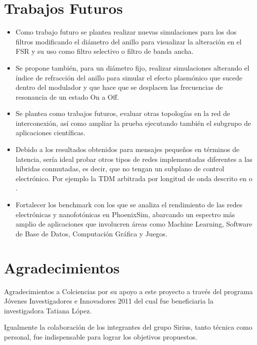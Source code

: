 \documentclass{IEEEtran}
\begin{document}
\section{Trabajos Futuros}
\begin{itemize}
\item Como trabajo futuro se plantea realizar nuevas simulaciones para los dos
filtros modificando el diámetro del anillo para visualizar 
la alteración en el FSR y su uso como filtro selectivo o filtro de banda ancha.
\item Se propone también, para un diámetro fijo, realizar simulaciones alterando 
el índice de refracción del anillo para simular el efecto plasmónico que 
sucede dentro del modulador y que hace que se desplacen las frecuencias de resonancia
de un estado On a Off.
\item Se plantea como trabajos futuros, evaluar otras topologías en
la red de interconexión, así como ampliar la prueba ejecutando también
el subgrupo de aplicaciones científicas.
\item Debido a los resultados obtenidos para mensajes pequeños en términos de 
latencia, sería ideal probar otros tipos de redes implementadas
diferentes a las híbridas conmutadas, es decir, que no tengan un subplano
de control electrónico. Por ejemplo la TDM arbitrada por longitud de onda
descrito en \cite{hendry2011time} o \cite{vantrease2008corona}.
\item Fortalecer los benchmark con los que se analiza el rendimiento de las redes
electrónicas y nanofotónicas en PhoenixSim, abarcando un espectro más amplio
de aplicaciones que involucren áreas como Machine Learning, Software de Base de Datos,
Computación Gráfica y Juegos.
\end{itemize} 

\section{Agradecimientos}
Agradecimientos a Colciencias por su apoyo a este proyecto
a través del programa Jóvenes Investigadores e Innovadores 2011
del cual fue beneficiaria la investigadora Tatiana López.

Igualmente la colaboración de los integrantes del grupo Sirius, tanto
técnica como personal, fue indispensable para lograr los objetivos 
propuestos.



\end{document}

